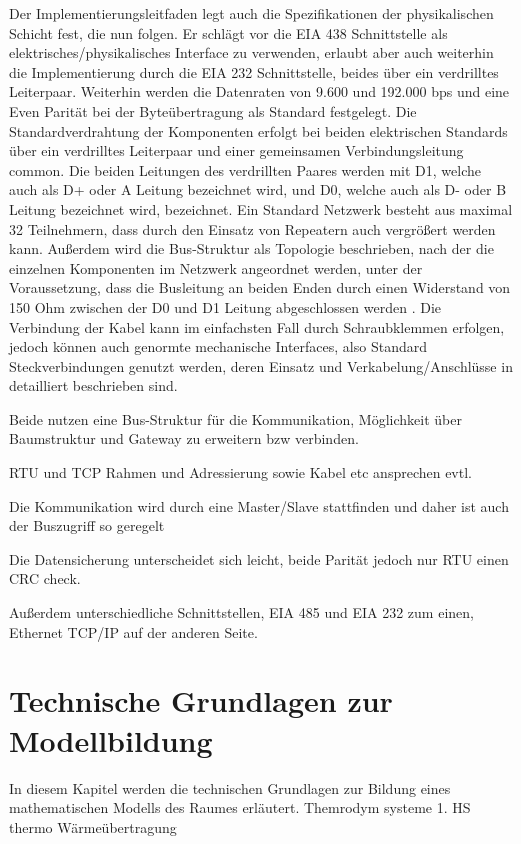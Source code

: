 Der Implementierungsleitfaden legt auch die Spezifikationen der physikalischen Schicht fest, die nun folgen. Er schlägt vor die EIA 438 Schnittstelle als elektrisches/physikalisches Interface zu verwenden, erlaubt aber auch weiterhin die Implementierung durch die EIA 232 Schnittstelle, beides über ein verdrilltes Leiterpaar. Weiterhin werden die Datenraten von 9.600 und 192.000 bps und eine Even Parität bei der Byteübertragung als Standard festgelegt. Die Standardverdrahtung der Komponenten erfolgt bei beiden elektrischen Standards über ein verdrilltes Leiterpaar und einer gemeinsamen Verbindungsleitung common. Die beiden Leitungen des verdrillten Paares werden mit D1, welche auch als D+ oder A Leitung bezeichnet wird, und D0, welche auch als D- oder B Leitung bezeichnet wird, bezeichnet. Ein Standard Netzwerk besteht aus maximal 32 Teilnehmern, dass durch den Einsatz von Repeatern auch vergrößert werden kann. Außerdem wird die Bus-Struktur als Topologie beschrieben, nach der die einzelnen Komponenten im Netzwerk angeordnet werden, unter der Voraussetzung, dass die Busleitung an beiden Enden durch einen Widerstand von 150 Ohm zwischen der D0 und D1 Leitung abgeschlossen werden \cite[S.~20ff.]{mod06ser}. Die Verbindung der Kabel kann im einfachsten Fall durch Schraubklemmen erfolgen, jedoch können auch genormte mechanische Interfaces, also Standard Steckverbindungen genutzt werden, deren Einsatz und Verkabelung/Anschlüsse in \cite[S.~29ff.]{mod06ser} detailliert beschrieben sind.

Beide nutzen eine Bus-Struktur für die Kommunikation, Möglichkeit über Baumstruktur und Gateway zu erweitern bzw verbinden.

RTU und TCP
Rahmen und Adressierung sowie Kabel etc ansprechen evtl.

Die Kommunikation wird durch eine Master/Slave stattfinden und daher ist auch der Buszugriff so geregelt

Die Datensicherung unterscheidet sich leicht, beide Parität jedoch nur RTU einen CRC check.

Außerdem unterschiedliche Schnittstellen, EIA 485 und EIA 232 zum einen, Ethernet TCP/IP auf der anderen Seite.

\section{Technische Grundlagen zur Modellbildung}
\label{sec:grundlagenmodell}
In diesem Kapitel werden die technischen Grundlagen zur Bildung eines mathematischen Modells des Raumes erläutert.
Themrodym systeme
1. HS thermo
Wärmeübertragung


